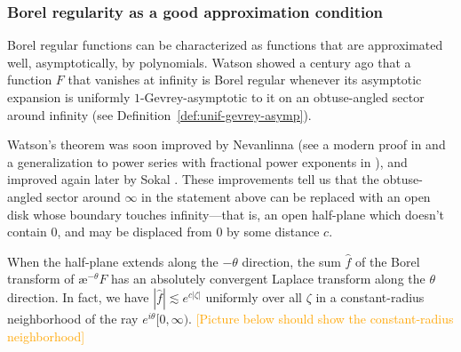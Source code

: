 \documentclass{article}
\theoremstyle{definition}
\newcommand{\aexp}{\text{\ae}}
\begin{document}
\subsubsection{Borel regularity as a good approximation condition}
Borel regular functions can be characterized as functions that are approximated well, asymptotically, by polynomials. Watson showed a century ago \cite{watson} that a function $F$ that vanishes at infinity is Borel regular whenever its asymptotic expansion is uniformly $1$-Gevrey-asymptotic to it on an obtuse-angled sector around infinity (see Definition~\ref{def:unif-gevrey-asymp}).

Watson's theorem was soon improved by Nevanlinna \cite{nevanlinna} (see a modern proof in \cite[Theorem~B.15]{nikolaev2023exact} and a generalization to power series with fractional power exponents in \cite{delabaere--rosoamanana}), and improved again later by Sokal \cite{sokal1980improvement}. These improvements tell us that the obtuse-angled sector around $\infty$ in the statement above can be replaced with an open disk whose boundary touches infinity---that is, an open half-plane which doesn't contain $0$, and may be displaced from $0$ by some distance $c$.
\begin{center}
\end{center}
When the half-plane extends along the $-\theta$ direction, the sum $\hat{f}$ of the Borel transform of $\aexp^{-\theta} F$ has an absolutely convergent Laplace transform along the $\theta$ direction. In fact, we have $|\hat{f}| \lesssim e^{c |\zeta|}$ uniformly over all $\zeta$ in a constant-radius neighborhood of the ray $e^{i\theta}[0, \infty)$. \textcolor{orange}{[Picture below should show the constant-radius neighborhood]}
\end{document}
